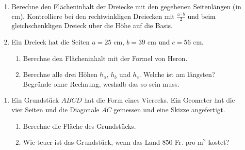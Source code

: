 \documentclass[11pt,oneside]{article}
\begin{document}
	\begin{aufgabe}
		\begin{enumerate}
			\item Berechne den Flächeninhalt der Dreiecke mit den gegebenen Seitenlängen (in cm). Kontrolliere bei den rechtwinkligen Dreiecken mit $\frac{a\cdot b}{2}$ und beim gleichschenkligen Dreieck über die Höhe auf die Basis.
			\item Ein Dreieck hat die Seiten $a=25$ cm, $b=39$ cm und $c=56$ cm.
			\begin{enumerate}[label=\alph*)]
				\item Berechne den Flächeninhalt mit der Formel von Heron.
				\item Berechne alle drei Höhen $h_a$, $h_b$ und $h_c$. Welche ist am längsten? Begründe ohne Rechnung, weshalb das so sein muss.
			\end{enumerate}
		\end{enumerate}
		\begin{minipage}{0.55\linewidth}
			\begin{enumerate}[resume]
				\item Ein Grundstück $ABCD$ hat die Form eines Vierecks. Ein Geometer hat die vier Seiten und die Diagonale $\overline{AC}$ gemessen und eine Skizze angefertigt.
				\begin{enumerate}[label=\alph*)]
					\item Berechne die Fläche des Grundstücks.
					\item Wie teuer ist das Grundstück, wenn das Land $850$ Fr. pro m$^2$ kostet?
				\end{enumerate}
			\end{enumerate}
		\end{minipage}
		\hfill
		\begin{minipage}{0.4\linewidth}
			\centering
			\begin{tikzpicture}[cross/.style={draw, cross out, minimum size=2*(#1-1pt), inner sep=0pt, outer sep=0pt}, x=1cm, y=1cm,
				>=latex,   %
				font=\footnotesize, scale=0.1]

\end{tikzpicture}
\end{minipage}
\end{aufgabe}
\end{document}
